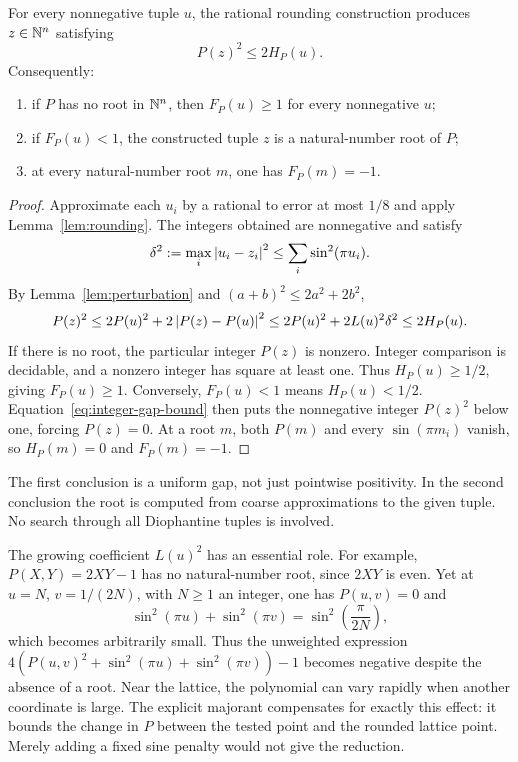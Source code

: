 \begin{theorem}\label{thm:lattice-gap}
For every nonnegative tuple $u$, the rational rounding construction produces
$z\in\mathbb N^n$ satisfying
\begin{equation}
 P(z)^2\le2H_P(u).\label{eq:integer-gap-bound}
\end{equation}
Consequently:
\begin{enumerate}
\item if $P$ has no root in $\mathbb N^n$, then $F_P(u)\ge1$ for every
      nonnegative $u$;
\item if $F_P(u)<1$, the constructed tuple $z$ is a natural-number root
      of $P$;
\item at every natural-number root $m$, one has $F_P(m)=-1$.
\end{enumerate}
\end{theorem}

\begin{proof}
Approximate each $u_i$ by a rational to error at most $1/8$ and apply
Lemma~\ref{lem:rounding}. The integers obtained are nonnegative and satisfy
\[
 \delta^2:=\max_i\left|u_i-z_i\right|^2
 \le\sum_i\sin^2(\pi u_i).
\]
By Lemma~\ref{lem:perturbation} and $(a+b)^2\le2a^2+2b^2$,
\[
 P(z)^2
 \le2P(u)^2+2\left|P(z)-P(u)\right|^2
 \le2P(u)^2+2L(u)^2\delta^2
 \le2H_P(u).
\]
If there is no root, the particular integer $P(z)$ is nonzero. Integer
comparison is decidable, and a nonzero integer has square at least one.
Thus $H_P(u)\ge1/2$, giving $F_P(u)\ge1$. Conversely, $F_P(u)<1$ means
$H_P(u)<1/2$. Equation~\eqref{eq:integer-gap-bound} then puts the
nonnegative integer $P(z)^2$ below one, forcing $P(z)=0$. At a root $m$,
both $P(m)$ and every $\sin(\pi m_i)$ vanish, so $H_P(m)=0$ and
$F_P(m)=-1$.
\end{proof}

The first conclusion is a uniform gap, not just pointwise positivity. In
the second conclusion the root is computed from coarse approximations to
the given tuple. No search through all Diophantine tuples is involved.

The growing coefficient $L(u)^2$ has an essential role. For example,
$P(X,Y)=2XY-1$ has no natural-number root, since $2XY$ is even. Yet at
$u=N$, $v=1/(2N)$, with $N\ge1$ an integer, one has $P(u,v)=0$ and
\[
 \sin^2(\pi u)+\sin^2(\pi v)
 =\sin^2\!\left(\frac{\pi}{2N}\right),
\]
which becomes arbitrarily small. Thus the unweighted expression
$4(P(u,v)^2+\sin^2(\pi u)+\sin^2(\pi v))-1$ becomes negative despite
the absence of a root. Near the lattice, the polynomial can vary rapidly
when another coordinate is large. The explicit majorant compensates for
exactly this effect: it bounds the change in $P$ between the tested point
and the rounded lattice point. Merely adding a fixed sine penalty would
not give the reduction.

